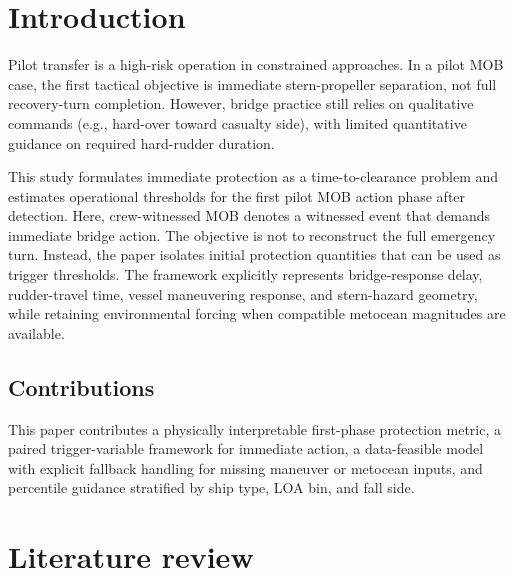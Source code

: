 \documentclass[preprint,12pt]{elsarticle}
\begin{document}
\section{Introduction}
Pilot transfer is a high-risk operation in constrained approaches. In a pilot MOB case, the first tactical objective is immediate stern-propeller separation, not full recovery-turn completion. However, bridge practice still relies on qualitative commands (e.g., hard-over toward casualty side), with limited quantitative guidance on required hard-rudder duration.

This study formulates immediate protection as a time-to-clearance problem and estimates operational thresholds for the first pilot MOB action phase after detection. Here, crew-witnessed MOB denotes a witnessed event that demands immediate bridge action. The objective is not to reconstruct the full emergency turn. Instead, the paper isolates initial protection quantities that can be used as trigger thresholds. The framework explicitly represents bridge-response delay, rudder-travel time, vessel maneuvering response, and stern-hazard geometry, while retaining environmental forcing when compatible metocean magnitudes are available.

\subsection*{Contributions}
This paper contributes a physically interpretable first-phase protection metric, a paired trigger-variable framework for immediate action, a data-feasible model with explicit fallback handling for missing maneuver or metocean inputs, and percentile guidance stratified by ship type, LOA bin, and fall side.

\section{Literature review}
\end{document}
